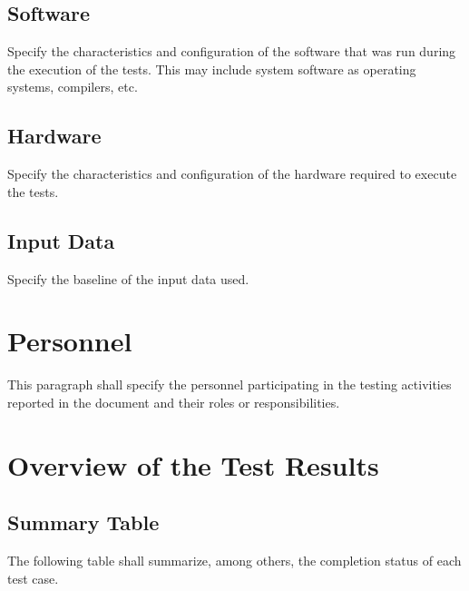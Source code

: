 \documentclass[DM,lsstdraft,STR,toc]{lsstdoc}
\begin{document}
\subsection{Software \label{sect:swconf}}
Specify the characteristics and configuration of the software that was run during the execution of the tests. This may include
system software as operating systems, compilers, etc.
\subsection{Hardware \label{sect:hwconf}}
Specify the characteristics and configuration of the hardware required to execute the tests.
\subsection{Input Data \label{sect:inputdata}}
Specify the baseline of the input data used.

\section{Personnel \label{sect:personnel}}
This paragraph shall specify the personnel participating in the testing activities reported in the document and their
roles or responsibilities.

\newpage

\section{Overview of the Test Results \label{sect:overview}}
\subsection{Summary Table \label{sect:summarytable}}
The following table shall summarize, among others, the completion status of each test case.\\
\end{document}
